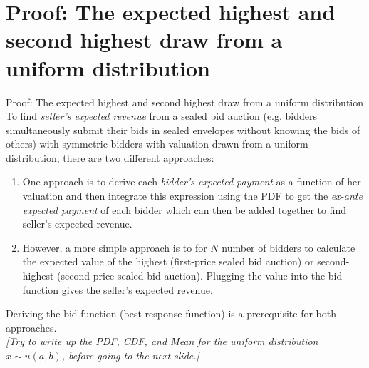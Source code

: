 \section{Proof: The expected highest and second highest draw from a uniform distribution}

\begin{frame}{Proof: The expected highest and second highest draw from a uniform distribution}
    To find \textit{seller's expected revenue} from a sealed bid auction (e.g. bidders simultaneously submit their bids in sealed envelopes without knowing the bids of others) with symmetric bidders with valuation drawn from a uniform distribution, there are two different approaches:
    \begin{enumerate}
      \item One approach is to derive each \textit{bidder's expected payment} as a function of her valuation and then integrate this expression using the PDF to get the \textit{ex-ante expected payment} of each bidder which can then be added together to find seller's expected revenue.
      \item However, a more simple approach is to for $N$ number of bidders to calculate the expected value of the highest (first-price sealed bid auction) or second-highest (second-price sealed bid auction). Plugging the value into the bid-function gives the seller's expected revenue.
    \end{enumerate}
    Deriving the bid-function (best-response function) is a prerequisite for both approaches.\\\medskip
    \textit{[Try to write up the PDF, CDF, and Mean for the uniform distribution $x\sim u(a, b)$, before going to the next slide.]}
\end{frame}
